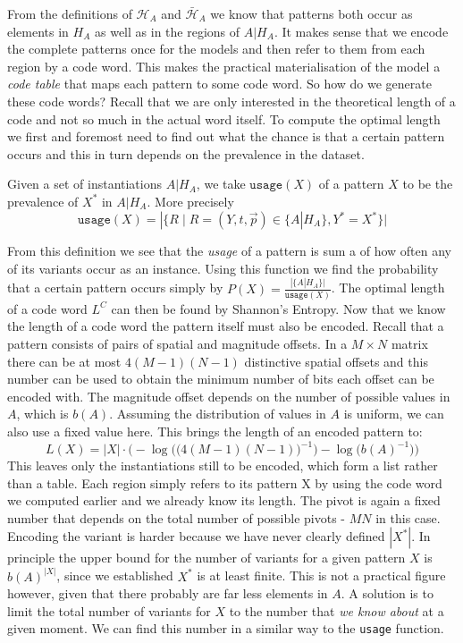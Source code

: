\documentclass{llncs}
\begin{document}
From the definitions of $\mathcal{H}_A$ and $\bar{\mathcal{H}}_A$ we know that patterns both occur as elements in $H_A$ as well as in the regions of $A|H_A$. It makes sense that we encode the complete patterns once for the models and then refer to them from each region by a code word. This makes the practical materialisation of the model a \emph{code table} that maps each pattern to some code word. So how do we generate these code words? Recall that we are only interested in the theoretical length of a code and not so much in the actual word itself. To compute the optimal length we first and foremost need to find out what the chance is that a certain pattern occurs and this in turn depends on the prevalence in the dataset.
\begin{definition}\label{usage}
Given a set of instantiations $A|H_A$, we take $\mathtt{usage}(X)$ of a pattern $X$ to be the prevalence of $X^*$ in $A|H_A$. More precisely 
$$\mathtt{usage}(X) = |\{R\mid R=(Y,t,\vec{p}) \in \{A|H_A\}, Y^*=X^*\}|$$
\end{definition}
From this definition we see that the \emph{usage} of a pattern is sum a of how often any of its variants occur as an instance. Using this function we find the probability that a certain pattern occurs simply by $P(X)=\frac{|\{A|H_A\}|}{\mathtt{usage}(X)}$. The optimal length of a code word $L^C$ can then be found by Shannon's Entropy. 
Now that we know the length of a code word the pattern itself must also be encoded. Recall that a pattern consists of pairs of spatial and magnitude offsets. In a $M\times N$ matrix there can be at most $4(M-1)(N-1)$ distinctive spatial offsets and this number can be used to obtain the minimum number of bits each offset can be encoded with. The magnitude offset depends on the number of possible values in $A$, which is $b(A)$. Assuming the distribution of values in $A$ is uniform, we can also use a fixed value here. This brings the length of an encoded pattern to:
$$
L(X)= |X| \cdot \bigg(-\log\Big(\big(4(M-1)(N-1)\big)^{-1}\Big) -\log\Big(b(A)^{-1}\Big)\bigg)
$$
This leaves only the instantiations still to be encoded, which form a list rather than a table. Each region simply refers to its pattern X by using the code word we computed earlier and we already know its length. The pivot is again a fixed number that depends on the total number of possible pivots - $MN$ in this case. Encoding the variant is harder because we have never clearly defined $|X^*|$. In principle the upper bound for the number of variants for a given pattern $X$ is $b(A)^{|X|}$, since we established $X^*$ is at least finite. This is not a practical figure however, given that there probably are far less elements in $A$. A solution is to limit the total number of variants for $X$ to the number that \emph{we know about} at a given moment. We can find this number in a similar way to the \texttt{usage} function. 
\end{document}
